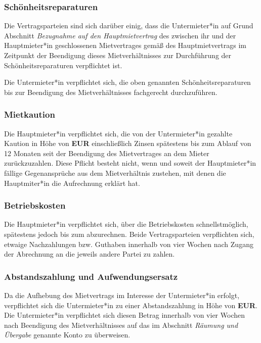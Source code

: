\subsubsection*{Schönheitsreparaturen}

Die Vertragsparteien sind sich darüber einig, dass die Untermieter*in auf
Grund Abschnitt \emph{Bezugnahme auf den Hauptmietvertrag} des zwischen ihr
und der Hauptmieter*in geschlossenen Mietvertrages gemäß \CONTRACTaesthetic
des Hauptmietvertrags im Zeitpunkt der Beendigung dieses Mietverhältnisses
zur Durchführung der Schönheitsreparaturen verpflichtet ist.

Die Untermieter*in verpflichtet sich, die oben genannten
Schönheitsreparaturen bis zur Beendigung des Mietverhältnisses fachgerecht
durchzuführen.

\subsubsection*{Mietkaution}

Die Hauptmieter*in verpflichtet sich, die von der Untermieter*in gezahlte
Kaution in Höhe von \textbf{\CONTRACTdeposit{} EUR} einschließlich Zinsen
spätestens bis zum Ablauf von 12 Monaten seit der Beendigung des
Mietvertrages an dem Mieter zurückzuzahlen. Diese Pflicht besteht nicht,
wenn und soweit der Hauptmieter*in fällige Gegenansprüche aus dem
Mietverhältnis zustehen, mit denen die Hauptmiter*in die Aufrechnung
erklärt hat.

\subsubsection*{Betriebskosten}

Die Hauptmieter*in verpflichtet sich, über die Betriebskosten
schnellstmöglich, spätestens jedoch bis zum \textbf{\CONTRACTutilities}
abzurechnen. Beide Vertragsparteien verpflichten sich, etwaige
Nachzahlungen bzw. Guthaben innerhalb von vier Wochen nach Zugang der
Abrechnung an die jeweils andere Partei zu zahlen.

\subsubsection*{Abstandszahlung und Aufwendungsersatz}

Da die Aufhebung des Mietvertrags im Interesse der Untermieter*in erfolgt,
verpflichtet sich die Untermieter*in zu einer Abstandszahlung in Höhe von
\textbf{\CONTRACTbonus{} EUR}. Die Untermieter*in verpflichtet sich diesen
Betrag innerhalb von vier Wochen nach Beendigung des Mietverhältnisses auf
das im Abschnitt \emph{Räumung und Übergabe} genannte Konto zu überweisen.

